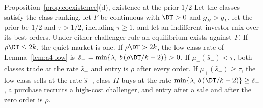 
\begin{named}{Proposition~\ref{prop:coexistence}(d), existence at the prior \(1/2\)}
Let the classes satisfy the class ranking, let \(F\) be continuous with \(\DT>0\) and \(g_H>g_L\), let the prior be \(1/2\) and
\(\tau>1/2\), including \(\tau\ge1\), and let an indifferent investor mix over its best orders. Under either challenger
rule an equilibrium exists against \(F\). If \(\rho\DT\le2k\), the quiet market is one. If \(\rho\DT>2k\), the low-class rate of Lemma~\ref{lem:a4-low} is
\(\hat s_-=\min\{\lambda,\,b\,(\rho\DT/k-2)\}>0\). If \(\mu_+(\hat s_-)<\tau\), both classes trade at the rate
\(\hat s_-\) and entry is \(\rho\) after every order. If \(\mu_+(\hat s_-)\ge\tau\), the low class sells at the rate
\(\hat s_-\), class \(H\) buys at the rate \(\min\{\lambda,\,b\,(\DT/k-2)\}\ge\hat s_-\), a purchase recruits a
high-cost challenger, and entry after a sale and after the zero order is \(\rho\).
\end{named}

